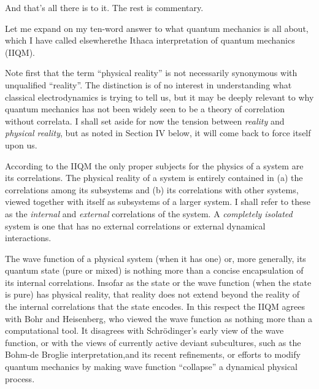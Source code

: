 And that's all there is to it.  The rest is commentary.  

\vfill\eject

\bigskip
{}
\medskip

Let me expand on my ten-word answer to what quantum mechanics is all
about, which I have called elsewhere\fn the Ithaca interpretation of
quantum mechanics (IIQM).

Note first that the term ``physical reality'' is not necessarily
synonymous with unqualified ``reality''.  The distinction is of no
interest in understanding what classical electrodynamics is trying to
tell us, but it may be deeply relevant to why quantum mechanics has
not been widely seen to be a theory of correlation without correlata.
I shall set aside for now the tension between {\it reality\/} and {\it
physical reality\/}, but as noted in Section IV below, it will come
back to force itself upon us.\fn

According to the IIQM the only proper subjects for the physics of a
system are its correlations.  The physical reality of a system is
entirely contained in (a) the correlations among its subsystems and
(b) its correlations with other systems, viewed together with itself as
subsystems of a larger system.  I shall refer to these as the {\it
internal\/} and {\it external\/} correlations of the system.  A {\it
completely isolated\/} system is one that has no external
correlations or external dynamical interactions.  

The wave function of a physical system (when it has one) or, more
generally, its quantum state (pure or mixed) is nothing more than a
concise encapsulation of its internal correlations.  Insofar as the
state or the wave function (when the state is pure) has physical
reality, that reality does not extend beyond the reality of the
internal correlations that the state encodes.  In this respect the
IIQM agrees with Bohr and Heisenberg, who viewed the wave function as
nothing more than a computational tool.  It disagrees with
Schr\"odinger's early view of the wave function, or with the views of
currently active deviant subcultures, such as the Bohm-de Broglie
interpretation,\fn and its recent refinements, or
efforts to modify quantum mechanics by making wave function
``collapse'' a dynamical physical process.\fn 

